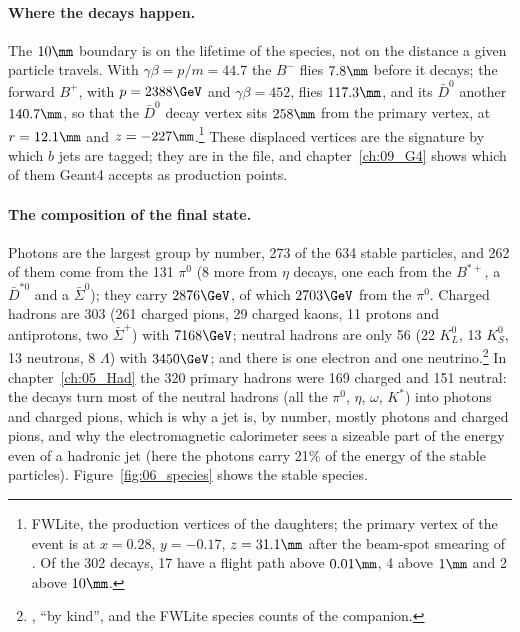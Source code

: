 \paragraph{Where the decays happen.}
The $10\mm$ boundary is on the lifetime of the species, not on the distance a given particle travels. With
$\gamma\beta = p/m = 44.7$ the $B^-$ flies $7.8\mm$ before it decays; the forward $B^+$, with $p = 2388\GeV$
and $\gamma\beta = 452$, flies $117.3\mm$, and its $\bar{D}^0$ another $140.7\mm$, so that the $\bar{D}^0$ decay
vertex sits $258\mm$ from the primary vertex, at $r = 12.1\mm$ and $z = -227\mm$.\footnote{FWLite, the production
vertices of the daughters; the primary vertex of the event is at $x = 0.28$, $y = -0.17$, $z = 31.1\mm$ after the
beam-spot smearing of . Of the 302 decays, 17 have a flight path above $0.01\mm$,
4 above $1\mm$ and 2 above $10\mm$.} These displaced vertices are the signature by which $b$ jets are tagged;
they are in the file, and chapter~\ref{ch:09_G4} shows which of them Geant4 accepts as production points.

\paragraph{The composition of the final state.}
Photons are the largest group by number, 273 of the 634 stable particles, and 262 of them come from the 131
$\pi^0$ (8 more from $\eta$ decays, one each from the $B^{*+}$, a $\bar{D}^{*0}$ and a $\bar{\Sigma}^0$); they
carry $2876\GeV$, of which $2703\GeV$ from the $\pi^0$. Charged hadrons are 303 (261 charged pions, 29
charged kaons, 11 protons and antiprotons, two $\bar{\Sigma}^+$) with $7168\GeV$; neutral hadrons are only 56
(22 $K^0_L$, 13 $K^0_S$, 13 neutrons, 8 $\Lambda$) with $3450\GeV$; and there is one electron and one
neutrino.\footnote{, ``by kind'', and the FWLite species counts of the
companion.} In chapter~\ref{ch:05_Had} the 320 primary hadrons were 169 charged and 151 neutral: the decays turn
most of the neutral hadrons (all the $\pi^0$, $\eta$, $\omega$, $K^*$) into photons and charged pions, which is why
a jet is, by number, mostly photons and charged pions, and why the electromagnetic calorimeter sees a sizeable
part of the energy even of a hadronic jet (here the photons carry 21\% of the energy of the stable particles).
Figure~\ref{fig:06_species} shows the stable species.

